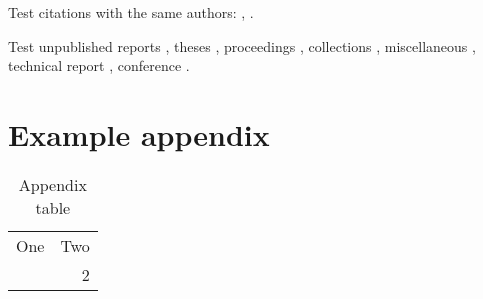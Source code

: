 \documentclass[draft]{mpi-far}
\begin{document}
Test citations with the same authors: \citep{ono2015marine,ono2015think,ono2015space},
\citet{ono2015marine,ono2015think,ono2015space}.

Test unpublished reports \citep{baker_census_2010},  theses \citep{carroll_rightwhale_2011},
proceedings \citep{bratten_working_1997}, 
collections \citep{gales_phocarctos_2008, sharp_sefra_2017},
miscellaneous \citep{delevie_hot_2014},
technical report \citep{helidoniotis_testing_2015}, conference \citep{newman_population_2008}.



\clearpage
\printbibliography

\clearpage
\newpage
\appendices
\section{Example appendix}

\begin{table}[h]
\caption{Appendix table}
\begin{center}
\begin{tabular}{rr}
One & Two \\ \addlinespace
1 & 2
\end{tabular}
\end{center}
\end{table}
\end{document}
